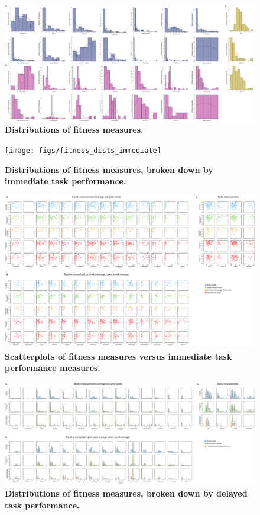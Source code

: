 \documentclass[10pt]{article}
\begin{document}
\begin{figure}
\centering
\includegraphics[width=\textwidth]{figs/fitness_distributions}
\caption{\textbf{Distributions of fitness measures.}}
\label{fig:fitness_dists}
\end{figure}

\begin{figure}
\centering
\texttt{[image: figs/fitness\_dists\_immediate]}
\caption{\textbf{Distributions of fitness measures, broken down
    by immediate task performance.}}
\label{fig:fitness_dists_immediate}
\end{figure}

\begin{figure}
\centering
\includegraphics[width=\textwidth]{figs/fitness_scatter_immediate}
\caption{\textbf{Scatterplots of fitness measures versus
    immediate task performance measures.}}
\label{fig:fitness_scatters_immediate}
\end{figure}

\begin{figure}
\centering
\includegraphics[width=\textwidth]{figs/fitness_dists_delayed}
\caption{\textbf{Distributions of fitness measures, broken down
    by delayed task performance.}}
\label{fig:fitness_dists_delayed}
\end{figure}
\end{document}
